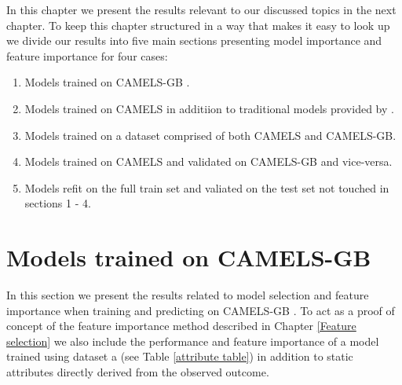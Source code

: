 In this chapter we present the results relevant to our discussed topics in the 
next chapter. To keep this chapter structured in a way that makes it easy to 
look up we divide our results into five main sections presenting model importance 
and feature importance for four cases:
\begin{enumerate}
    \item Models trained on CAMELS-GB \citep{CAMELS_GB}.
    \item Models trained on CAMELS \citep{CAMELS_US} in additiion to traditional 
        models provided by \citationneeded.
    \item Models trained on a dataset comprised of both CAMELS and CAMELS-GB.
    \item Models trained on CAMELS and validated on CAMELS-GB and vice-versa.
    \item Models refit on the full train set and valiated on the test set not 
        touched in sections 1 - 4.
\end{enumerate}

\section{Models trained on CAMELS-GB}
In this section we present the results related to model selection and feature 
importance when training and predicting on CAMELS-GB \citep{CAMELS_GB}. To act 
as a proof of concept of the feature importance method described in Chapter 
\ref{Feature selection} we also include the performance and feature importance of 
a model trained using dataset a (see Table \ref{attribute table}) in addition to
static attributes directly derived from the observed outcome.

